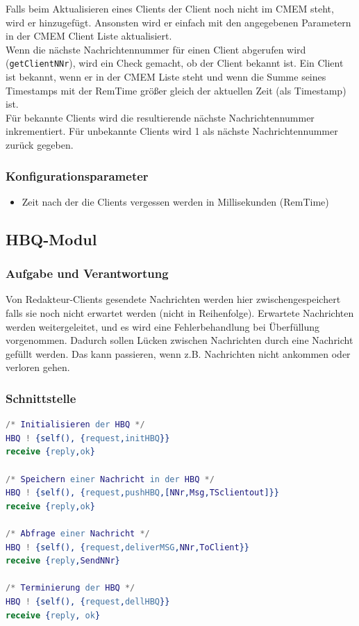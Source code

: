 \documentclass{article}
\begin{document}
Falls beim Aktualisieren eines Clients der Client noch nicht im CMEM steht, wird er hinzugefügt.
Ansonsten wird er einfach mit den angegebenen Parametern in der CMEM Client Liste aktualisiert.\\

Wenn die nächste Nachrichtennummer für einen Client abgerufen wird (\texttt{getClientNNr}), wird ein Check gemacht, ob der Client bekannt ist.
Ein Client ist bekannt, wenn er in der CMEM Liste steht und wenn die Summe seines Timestamps mit der RemTime größer gleich der aktuellen Zeit (als Timestamp) ist.\\

Für bekannte Clients wird die resultierende nächste Nachrichtennummer inkrementiert. Für unbekannte Clients wird 1 als nächste Nachrichtennummer zurück gegeben.

\subsubsection{Konfigurationsparameter}
\begin{itemize}
    \item Zeit nach der die Clients vergessen werden in Millisekunden (RemTime)
\end{itemize}

\newpage
			
\subsection{HBQ-Modul}
\subsubsection{Aufgabe und Verantwortung}

Von Redakteur-Clients gesendete Nachrichten werden hier zwischengespeichert falls sie noch nicht
erwartet werden (nicht in Reihenfolge). Erwartete Nachrichten werden weitergeleitet, und es wird eine Fehlerbehandlung
bei Überfüllung vorgenommen. Dadurch sollen Lücken zwischen Nachrichten durch eine Nachricht gefüllt werden. Das kann
passieren, wenn z.B. Nachrichten nicht ankommen oder verloren gehen.

\subsubsection{Schnittstelle}
\begin{lstlisting}[language=Erlang]
/* Initialisieren der HBQ */
HBQ ! {self(), {request,initHBQ}}
receive {reply,ok}

/* Speichern einer Nachricht in der HBQ */
HBQ ! {self(), {request,pushHBQ,[NNr,Msg,TSclientout]}}
receive {reply,ok}

/* Abfrage einer Nachricht */
HBQ ! {self(), {request,deliverMSG,NNr,ToClient}}
receive {reply,SendNNr}

/* Terminierung der HBQ */
HBQ ! {self(), {request,dellHBQ}}
receive {reply, ok}
\end{lstlisting}
\end{document}
